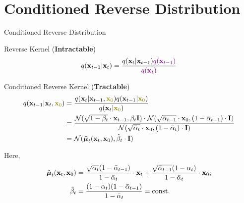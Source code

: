 \documentclass{beamer}
\renewcommand{\eqpause}{}
\renewcommand{\nextonslide}[1]{#1}
\begin{document}
\section{Conditioned Reverse Distribution}
\begin{frame}{Conditioned Reverse Distribution}
    \begin{block}{Reverse Kernel (\textbf{Intractable})}
        \vspace{-0.3cm}
        \[
            q(\mathbf{x}_{t-1}|\mathbf{x}_{t}) = \frac{q(\mathbf{x}_{t}|\mathbf{x}_{t-1}) {\color{violet}q(\mathbf{x}_{t-1})}}{{\color{violet}q(\mathbf{x}_{t})}} 
        \]
        \vspace{-0.5cm}
    \end{block}
    \eqpause
    \begin{block}{Conditioned Reverse Kernel (\textbf{Tractable})}
        \vspace{-0.6cm}
        \begin{align*}
            q(\bx_{t-1}|\bx_{t}, {\color{olive}\bx_0}) & = \frac{q(\bx_{t}|\bx_{t-1}, {\color{olive}\bx_0}) q(\bx_{t-1} | {\color{olive}\bx_0}) }{q(\bx_{t}| {\color{olive}\bx_0})} \\
            \nextonslide{& = \frac{\cN(\sqrt{1 - \beta_t} \cdot \bx_{t-1}, \beta_t \bI) \cdot \cN(\sqrt{\bar{\alpha}_{t-1}} \cdot \bx_0, (1 - \bar{\alpha}_{t-1}) \cdot \bI)}{ \cN(\sqrt{\bar{\alpha}_t} \cdot \bx_0, (1 - \bar{\alpha}_t) \cdot \bI)}} \\
            \nextonslide{&= \cN(\tilde{\bmu}_t(\bx_t, \bx_0), \tilde{\beta}_t \cdot \bI)}
        \end{align*}
        \vspace{-0.7cm}
    \end{block}
    Here,
    \vspace{-0.5cm}
    \begin{align*}
        \tilde{\boldsymbol{\mu}}_t(\mathbf{x}_t, \mathbf{x}_0) &= \frac{\sqrt{\alpha_t}(1 - \bar{\alpha}_{t-1})}{1 - \bar{\alpha}_t} \cdot \mathbf{x}_t + \frac{\sqrt{\bar{\alpha}_{t-1}}(1 - \alpha_t)}{1 - \bar{\alpha}_t} \cdot \mathbf{x}_0; \\
        \tilde{\beta}_t &= \frac{(1 - \alpha_t)(1 - \bar{\alpha}_{t-1})}{1 - \bar{\alpha}_t} = \text{const}.
    \end{align*}
\end{frame}
\end{document}

